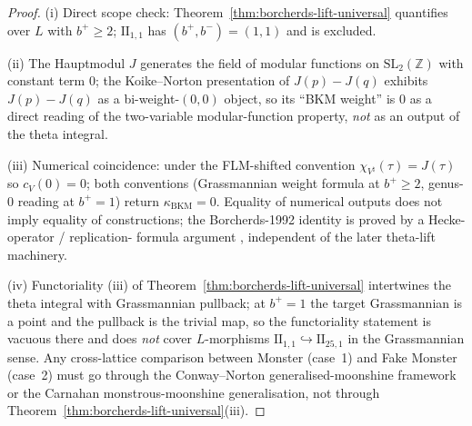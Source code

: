 \begin{proof}
(i) Direct scope check: Theorem~\ref{thm:borcherds-lift-universal}
quantifies over $L$ with $b^+ \ge 2$; $\mathrm{II}_{1,1}$ has
$(b^+, b^-) = (1, 1)$ and is excluded.
\par
(ii) The Hauptmodul $J$ generates the field of modular functions on
$\mathrm{SL}_2(\mathbb{Z})$ with constant term $0$; the Koike--Norton
presentation of $J(p) - J(q)$ \cite[\S8]{Borcherds1992} exhibits
$J(p) - J(q)$ as a bi-weight-$(0,0)$ object, so its ``BKM weight''
is $0$ as a direct reading of the two-variable modular-function
property, \emph{not} as an output of the theta integral.
\par
(iii) Numerical coincidence: under the FLM-shifted convention
$\chi_{V^\natural}(\tau) = J(\tau)$ so $c_V(0) = 0$; both
conventions (Grassmannian weight formula at $b^+ \ge 2$, genus-$0$
reading at $b^+ = 1$) return $\kappa_{\mathrm{BKM}} = 0$. Equality
of numerical outputs does not imply equality of constructions; the
Borcherds-1992 identity is proved by a Hecke-operator / replication-
formula argument \cite[Thm.~8.1, Thm.~10.1]{Borcherds1992},
independent of the later theta-lift machinery.
\par
(iv) Functoriality (iii) of Theorem~\ref{thm:borcherds-lift-universal}
intertwines the theta integral with Grassmannian pullback; at
$b^+ = 1$ the target Grassmannian is a point and the pullback is the
trivial map, so the functoriality statement is vacuous there and
does \emph{not} cover $L$-morphisms $\mathrm{II}_{1,1}
\hookrightarrow \mathrm{II}_{25,1}$ in the Grassmannian sense. Any
cross-lattice comparison between Monster (case~1) and Fake Monster
(case~2) must go through the Conway--Norton generalised-moonshine
framework \cite{ConwayNorton1979} or the Carnahan monstrous-moonshine
generalisation, not through
Theorem~\ref{thm:borcherds-lift-universal}(iii).
\end{proof}

